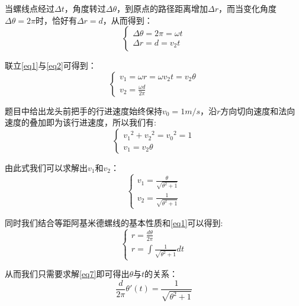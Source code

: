 \documentclass[withoutpreface,bwprint]{cumcmthesis} %
\begin{document}
当螺线点经过$\Delta t$，角度转过$\Delta \theta$，到原点的路径距离增加$\Delta r$，而当变化角度$\Delta \theta = 2\pi$时，恰好有$\Delta r = d$，从而得到：
\begin{equation}
\begin{cases}
    \Delta \theta = 2 \pi = \omega t\\
    \Delta r = d = v_2 t
\end{cases}
\label{eq2}
\end{equation}

联立\cref{eq1}与\cref{eq2}可得到：
\begin{equation}
\begin{cases}
    v_1 = \omega r = \omega v_2 t = v_2 \theta\\
    v_2 = \frac{\omega d}{2\pi}
\end{cases}
\label{eq3}
\end{equation}

题目中给出龙头前把手的行进速度始终保持$v_0 = 1m/s$，沿$r$方向切向速度和法向速度的叠加即为该行进速度，所以我们有:
\begin{equation}
\begin{cases}
    {v_1}^2 + {v_2}^2 = {v_0}^2 = 1\\
    v_1 = v_2\theta
\end{cases}
\label{eq4}
\end{equation}

由此式我们可以求解出$v_1$和$v_2$：
\begin{equation}
\begin{cases}
    v_1 = \frac{\theta}{\sqrt{\theta^2 + 1}}\\
    v_2 = \frac{1}{\sqrt{\theta^2 + 1}}
\end{cases}
\label{eq5}
\end{equation}

同时我们结合等距阿基米德螺线的基本性质和\cref{eq1}可以得到:
\begin{equation}
\begin{cases}
    r = \frac{d\theta}{2\pi}\\
    r = \int{\!\!\frac{1}{\sqrt{\theta^2 + 1}}}dt
\end{cases}
\label{eq6}
\end{equation}

从而我们只需要求解\cref{eq7}即可得出$\theta$与$t$的关系：
\begin{equation}
\frac{d}{2\pi}\theta'(t) = \frac{1}{\sqrt{\theta^2 + 1}}
\label{eq7}
\end{equation}
\end{document}

